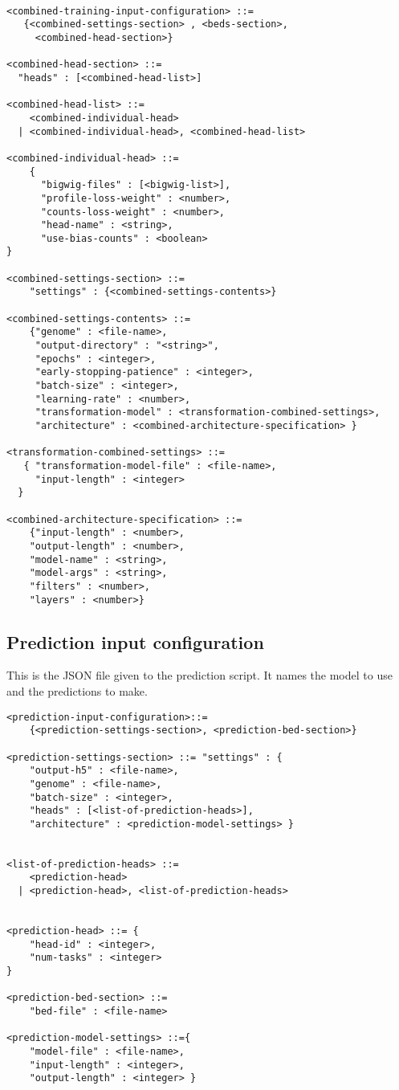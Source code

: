 \documentclass{article}
\begin{document}
\begin{lstlisting}

<combined-training-input-configuration> ::= 
   {<combined-settings-section> , <beds-section>, 
     <combined-head-section>}

<combined-head-section> ::= 
  "heads" : [<combined-head-list>]

<combined-head-list> ::= 
    <combined-individual-head>
  | <combined-individual-head>, <combined-head-list>

<combined-individual-head> ::=
    {
      "bigwig-files" : [<bigwig-list>],
      "profile-loss-weight" : <number>,
      "counts-loss-weight" : <number>,
      "head-name" : <string>,
      "use-bias-counts" : <boolean>
}

<combined-settings-section> ::= 
    "settings" : {<combined-settings-contents>}

<combined-settings-contents> ::= 
    {"genome" : <file-name>, 
     "output-directory" : "<string>",
     "epochs" : <integer>, 
     "early-stopping-patience" : <integer>, 
     "batch-size" : <integer>, 
     "learning-rate" : <number>, 
     "transformation-model" : <transformation-combined-settings>,
     "architecture" : <combined-architecture-specification> } 

<transformation-combined-settings> ::= 
   { "transformation-model-file" : <file-name>, 
     "input-length" : <integer>
  }

<combined-architecture-specification> ::= 
    {"input-length" : <number>, 
    "output-length" : <number>,
    "model-name" : <string>,
    "model-args" : <string>,
    "filters" : <number>,
    "layers" : <number>}
\end{lstlisting}

\subsection{Prediction input configuration}
This is the JSON file given to the prediction script. It names the model to use and the predictions to make. 

\begin{lstlisting}
<prediction-input-configuration>::=
    {<prediction-settings-section>, <prediction-bed-section>}

<prediction-settings-section> ::= "settings" : {
    "output-h5" : <file-name>,
    "genome" : <file-name>,
    "batch-size" : <integer>,
    "heads" : [<list-of-prediction-heads>],
    "architecture" : <prediction-model-settings> }


<list-of-prediction-heads> ::=
    <prediction-head> 
  | <prediction-head>, <list-of-prediction-heads>


<prediction-head> ::= {
    "head-id" : <integer>,
    "num-tasks" : <integer>
}

<prediction-bed-section> ::=
    "bed-file" : <file-name>

<prediction-model-settings> ::={
    "model-file" : <file-name>,
    "input-length" : <integer>,
    "output-length" : <integer> }
\end{lstlisting}
\end{document}
